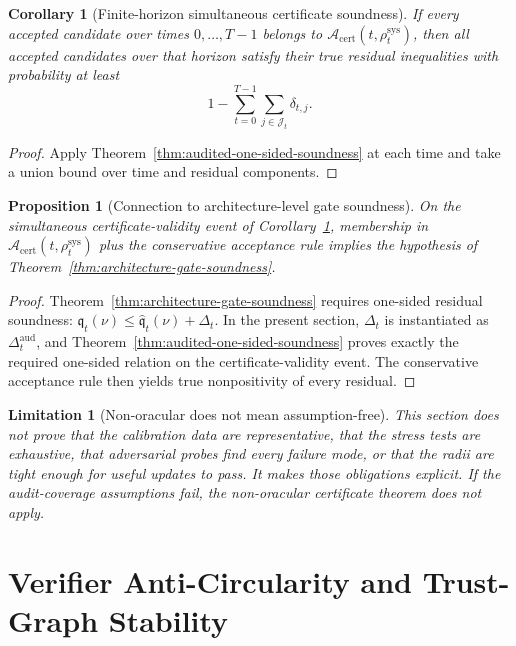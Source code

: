 \documentclass[11pt,a4paper]{article}
\newtheorem{proposition}[theorem]{Proposition}
\newtheorem{corollary}[theorem]{Corollary}
\newtheorem{limitation}[theorem]{Limitation}
\newcommand{\Acal}{\mathcal A}
\newcommand{\sys}{\mathrm{sys}}
\newcommand{\aud}{\mathrm{aud}}
\newcommand{\cert}{\mathrm{cert}}
\begin{document}
\begin{corollary}[Finite-horizon simultaneous certificate soundness]
\label{cor:finite-horizon-cert-soundness}
If every accepted candidate over times \(0,\ldots,T-1\) belongs to \(\Acal_{\cert}(t,\rho_t^{\sys})\), then all accepted candidates over that horizon satisfy their true residual inequalities with probability at least
\[
1-\sum_{t=0}^{T-1}\sum_{j\in\mathcal J_t}\delta_{t,j}.
\]
\end{corollary}

\begin{proof}
Apply Theorem~\ref{thm:audited-one-sided-soundness} at each time and take a union bound over time and residual components.
\end{proof}

\begin{proposition}[Connection to architecture-level gate soundness]
\label{prop:non-oracular-implies-gate-soundness}
On the simultaneous certificate-validity event of Corollary~\ref{cor:finite-horizon-cert-soundness}, membership in \(\Acal_{\cert}(t,\rho_t^{\sys})\) plus the conservative acceptance rule implies the hypothesis of Theorem~\ref{thm:architecture-gate-soundness}.
\end{proposition}

\begin{proof}
Theorem~\ref{thm:architecture-gate-soundness} requires one-sided residual soundness: \(\mathfrak q_t(\nu)\le \widehat{\mathfrak q}_t(\nu)+\Delta_t\). In the present section, \(\Delta_t\) is instantiated as \(\Delta_t^{\aud}\), and Theorem~\ref{thm:audited-one-sided-soundness} proves exactly the required one-sided relation on the certificate-validity event. The conservative acceptance rule then yields true nonpositivity of every residual.
\end{proof}

\begin{limitation}[Non-oracular does not mean assumption-free]
This section does not prove that the calibration data are representative, that the stress tests are exhaustive, that adversarial probes find every failure mode, or that the radii are tight enough for useful updates to pass. It makes those obligations explicit. If the audit-coverage assumptions fail, the non-oracular certificate theorem does not apply.
\end{limitation}


\section{Verifier Anti-Circularity and Trust-Graph Stability}
\label{sec:verifier-anti-circularity}
\end{document}
